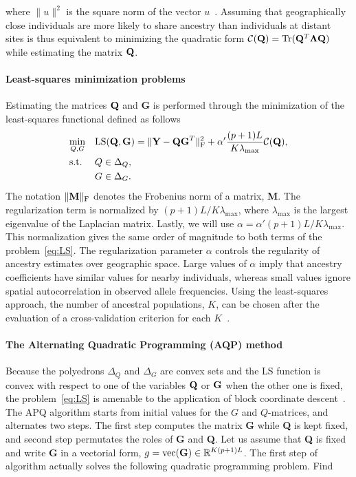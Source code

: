  \noindent  where $\|  u \|^2$ is the square norm of the vector $u$~\citep{DengCai2011}. Assuming that geographically close individuals are more likely to share ancestry than individuals at distant sites  is thus equivalent to minimizing the quadratic form ${\cal C}({\bf Q}) ={\rm Tr} ({\bf Q}^T {\bf \Lambda} {\bf Q})$ while estimating the matrix ${\bf Q}$. 

\paragraph{Least-squares minimization problems} Estimating the matrices ${\bf Q}$ and {\bf G } is performed through the minimization of the least-squares functional defined as follows~\citep{Caye2016}
\begin{equation}
\begin{aligned}
& \underset{Q, G}{\text{min}}
& & {\rm LS}({\bf Q}, {\bf G}) =   \|  {\bf Y} - {\bf QG}^T \|^2_{\rm F} +  \alpha ' \frac{(p+1)L}{K \lambda_{\max}} {\cal C}({\bf Q}) , \\
& \text{s.t.} & &  Q \in \Delta_Q , \\
& & &  G \in \Delta_G . \\
\end{aligned}
\label{eq:LS}
\end{equation}
 \noindent The notation $\|  {\bf M}  \|_{\rm F}$ denotes the Frobenius norm of a matrix, {\bf M}. The regularization term is normalized by $(p+1)L/K \lambda_{\max}$, where $\lambda_{\max}$ is the largest eigenvalue of the Laplacian matrix. Lastly, we will use $\alpha = \alpha ' (p+1)L/K \lambda_{\max}$. This normalization gives the same order of magnitude to both terms of the problem~\eqref{eq:LS}. The regularization parameter $\alpha$ controls the regularity of ancestry estimates over geographic space.  Large values of $\alpha$ imply that ancestry coefficients have similar values for nearby individuals, whereas small values ignore spatial autocorrelation in observed allele frequencies. Using the least-squares approach, the number of ancestral populations, $K$, can be chosen after the evaluation of a cross-validation criterion for each $K$~\citep{Alexander2011, Frichot2014, Frichot2015}.


\paragraph{The Alternating Quadratic Programming (AQP) method} Because the poly\-edrons $\Delta_Q$ and  $\Delta_G$ are convex sets and the LS function is convex with
respect to one of the variables ${\bf Q}$ or ${\bf G}$ when the other one is fixed, the problem~\eqref{eq:LS} is amenable to the application of block coordinate descent~\citep{Bertsekas1995}. The APQ algorithm starts from initial values for the $G$ and $Q$-matrices, and alternates two steps. The first step computes the matrix {\bf G} while  {\bf Q} is kept fixed, and second step permutates the roles of {\bf G} and {\bf Q}.  Let us assume that {\bf Q} is fixed and write {\bf G} in a vectorial form, $g = {\rm vec({\bf G})} \in \mathbb{R}^{K(p + 1)L}$. The first step of algorithm actually solves the following quadratic programming problem. Find  

